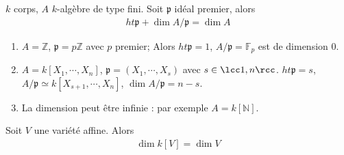             \begin{theo}
                $k$ corps, $A$ $k$-algèbre de type fini. Soit $\mathfrak{p}$ idéal premier, alors 
                \begin{align*}
                    ht \mathfrak{p} + \dim A/\mathfrak{p} = \dim A
                \end{align*}
            \end{theo}
            \begin{expl}
                \begin{enumerate}
                    \item $A = \mathbb{Z}$, $\mathfrak{p} = p \mathbb{Z}$ avec $p$ premier; Alors $ht \mathfrak{p} = 1$, $A/ \mathfrak{p} = \mathbb{F}_p$ est de dimension $0$.
                    \item $A = k[X_1, \cdots, X_n]$, $\mathfrak{p} = (X_1, \cdots, X_s)$ avec $s \in \lcc 1,n \rcc$. $ht \mathfrak{p} = s$, $A/\mathfrak{p} \simeq k[X_{s+1}, \cdots, X_n]$, $\dim A/\mathfrak{p} = n-s$.
                    \item La dimension peut être infinie : par exemple $A = k[\mathbb{N}]$.
                \end{enumerate}
            \end{expl}
            \begin{theo}
                Soit $V$ une variété affine. Alors
                \begin{align*}
                    \dim k[V] = \dim V
                \end{align*}
            \end{theo}

